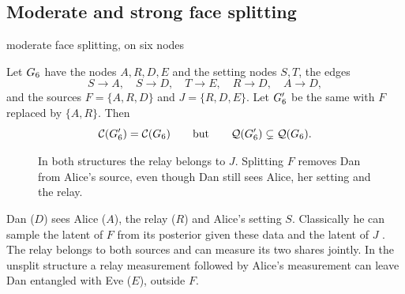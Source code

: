 \subsection{Moderate and strong face splitting}\label{sec:leaky}

\begin{cexbox}{moderate face splitting, on six nodes}
\begin{theorem}\label{thm:sixnode}
Let $G_6$ have the nodes $A,R,D,E$ and the setting nodes $S,T$, the edges
\[S\to A,\quad S\to D,\quad T\to E,\quad R\to D,\quad A\to D,\]
and the sources $F=\{A,R,D\}$ and $J=\{R,D,E\}$. Let $G_6'$ be the same with $F$ replaced by $\{A,R\}$. Then
\[
\mathcal{C}(G_6')=\mathcal{C}(G_6)\qquad\text{but}\qquad\mathcal{Q}(G_6')\subsetneq\mathcal{Q}(G_6).
\]
\end{theorem}
\end{cexbox}

\begin{figure}[H]
\centering
{}
\caption{In both structures the relay belongs to $J$. Splitting $F$ removes Dan from Alice's source, even though Dan still sees Alice, her setting and the relay.}
\label{fig:sixnode}
\end{figure}

Dan ($D$) sees Alice ($A$), the relay ($R$) and Alice's setting $S$. Classically he can sample the latent of $F$ from its posterior
given these data and the latent of $J$ \cite{AWS}. The relay belongs to both sources and can measure its two shares jointly.
In the unsplit structure a relay measurement followed by Alice's measurement can leave Dan entangled with Eve ($E$), outside $F$.


